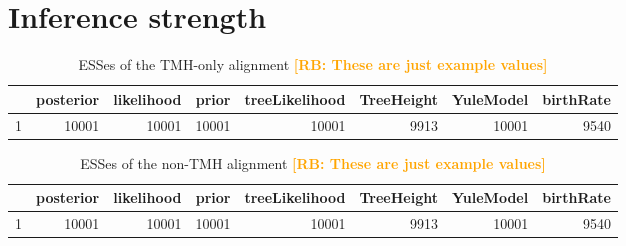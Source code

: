 \documentclass{article}
\newcommand{\richel}[1]{\textcolor{orange}{\textbf{[RB: #1]}}}
\begin{document}
\section{Inference strength}

\begin{table}[ht]
\centering
\begin{tabular}{rrrrrrrr}
  \hline
 & posterior & likelihood & prior & treeLikelihood & TreeHeight & YuleModel & 
birthRate \\ 
  \hline
1 & 10001 & 10001 & 10001 & 10001 & 9913 & 10001 & 9540 \\ 
   \hline
\end{tabular}
\caption{
  ESSes of the TMH-only alignment
  \richel{These are just example values}
} 
\label{tab:esses_tmh}
\end{table}

\begin{table}[ht]
\centering
\begin{tabular}{rrrrrrrr}
  \hline
 & posterior & likelihood & prior & treeLikelihood & TreeHeight & YuleModel & 
birthRate \\ 
  \hline
1 & 10001 & 10001 & 10001 & 10001 & 9913 & 10001 & 9540 \\ 
   \hline
\end{tabular}
\caption{
  ESSes of the non-TMH alignment
  \richel{These are just example values}
} 
\label{tab:esses_non_tmh}
\end{table}
\end{document}
